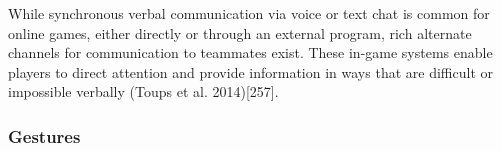 While synchronous verbal communication
via voice or text chat is common for online games, either directly or through an external
program, rich alternate channels for communication to teammates exist. These in-game systems
enable players to direct attention and provide information in ways that are difficult or
impossible verbally (Toups et al. 2014)[257].

\subsubsection{Gestures}

